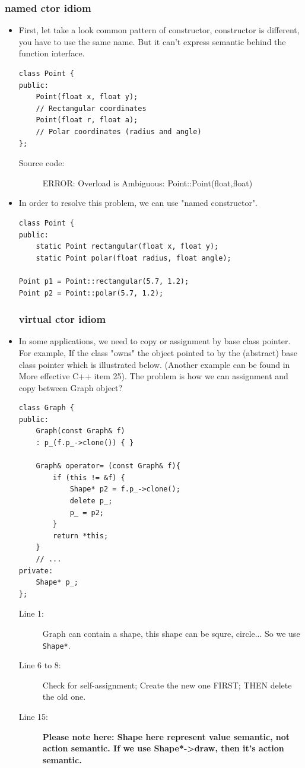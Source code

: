 \documentclass[a4paper,11pt,twoside]{book}
\begin{document}
\subsubsection{named ctor idiom}
\begin{itemize}
	\item First, let take a look common pattern of constructor, constructor is different, you have to use the same name. But it can't express semantic behind the function interface.
\begin{lstlisting}
class Point {
public:
	Point(float x, float y);     
	// Rectangular coordinates
	Point(float r, float a);     
	// Polar coordinates (radius and angle)
};
\end{lstlisting}
\begin{description}
	\item[Source code:] ERROR: Overload is Ambiguous: Point::Point(float,float)
\end{description}

\item In order to resolve this problem, we can use "named constructor". 
\begin{lstlisting}
class Point {
public:
	static Point rectangular(float x, float y);
	static Point polar(float radius, float angle);
	
Point p1 = Point::rectangular(5.7, 1.2);
Point p2 = Point::polar(5.7, 1.2);
\end{lstlisting}

\subsubsection{virtual ctor idiom}
	
	\item In some applications, we need to copy or assignment by base class pointer. For example, If the class "owns" the object pointed to by the (abstract) base class pointer which is illustrated below. (Another example can be found in More effective C++ item 25). The problem is how we can assignment and copy between Graph object? 
	
\begin{lstlisting}
class Graph {
public:
	Graph(const Graph& f)
	: p_(f.p_->clone()) { }
	
	Graph& operator= (const Graph& f){
		if (this != &f) {              
			Shape* p2 = f.p_->clone();   
			delete p_;                   
			p_ = p2;
		}
		return *this;
	}
	// ...
private:
	Shape* p_; 
};
\end{lstlisting}
\begin{description}
	\item[Line 1:] Graph can contain a shape, this shape can be squre, circle... So we use \texttt{Shape*}. 
	\item[Line 6 to 8:] Check for self-assignment; Create the new one FIRST; THEN delete the old one.
	\item[Line 15:]  \textbf{Please note here: Shape here represent value semantic, not action semantic. If we use Shape*->draw, then it's action semantic.}
\end{description}


\end{itemize}
\end{document}
